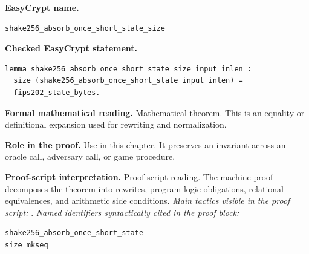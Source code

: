 \begin{formaltheorem}
\noindent\textbf{EasyCrypt name.}
\begin{lstlisting}[language=EasyCrypt,basicstyle=\ttfamily\scriptsize]
shake256_absorb_once_short_state_size
\end{lstlisting}
\noindent\textbf{Checked EasyCrypt statement.}
\begin{lstlisting}[language=EasyCrypt,basicstyle=\ttfamily\scriptsize]
lemma shake256_absorb_once_short_state_size input inlen :
  size (shake256_absorb_once_short_state input inlen) =
  fips202_state_bytes.
\end{lstlisting}
\noindent\textbf{Formal mathematical reading.}
Mathematical theorem. This is an equality or definitional expansion used for rewriting and normalization.

\noindent\textbf{Role in the proof.}
Use in this chapter. It preserves an invariant across an oracle call, adversary call, or game procedure.

\noindent\textbf{Proof-script interpretation.}
Proof-script reading. The machine proof decomposes the theorem into rewrites, program-logic obligations, relational equivalences, and arithmetic side conditions.
\emph{Main tactics visible in the proof script:} .
\emph{Named identifiers syntactically cited in the proof block:}
\begin{lstlisting}[language=EasyCrypt,basicstyle=\ttfamily\scriptsize]
shake256_absorb_once_short_state
size_mkseq
\end{lstlisting}

\end{formaltheorem}

